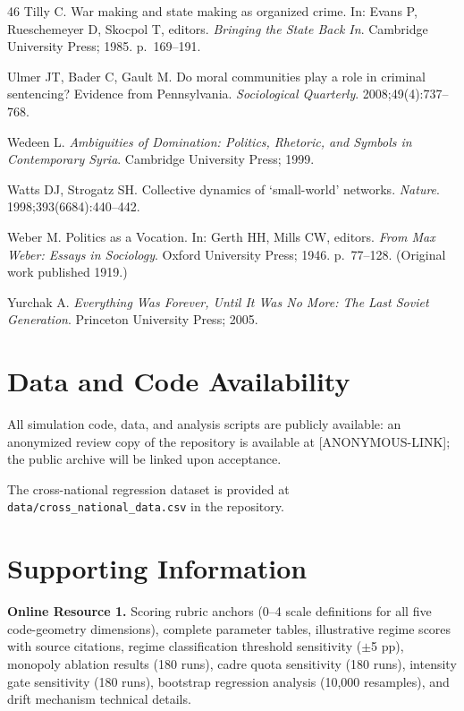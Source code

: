 \documentclass[12pt]{article}
\begin{document}
\begin{thebibliography}{46}
Tilly C.
War making and state making as organized crime.
In: Evans P, Rueschemeyer D, Skocpol T, editors.
\textit{Bringing the State Back In}.
Cambridge University Press; 1985. p.~169--191.

Ulmer JT, Bader C, Gault M.
Do moral communities play a role in criminal sentencing? Evidence from Pennsylvania.
\textit{Sociological Quarterly}. 2008;49(4):737--768.

Wedeen L.
\textit{Ambiguities of Domination: Politics, Rhetoric, and Symbols in Contemporary Syria}.
Cambridge University Press; 1999.

Watts DJ, Strogatz SH.
Collective dynamics of `small-world' networks.
\textit{Nature}. 1998;393(6684):440--442.

Weber M.
Politics as a Vocation.
In: Gerth HH, Mills CW, editors.
\textit{From Max Weber: Essays in Sociology}.
Oxford University Press; 1946. p.~77--128.
(Original work published 1919.)

Yurchak A.
\textit{Everything Was Forever, Until It Was No More: The Last Soviet Generation}.
Princeton University Press; 2005.

\end{thebibliography}

\section*{Data and Code Availability}

All simulation code, data, and analysis scripts are publicly available: an anonymized review copy of the repository is available at [ANONYMOUS-LINK]; the public archive will be linked upon acceptance.

The cross-national regression dataset is provided at \texttt{data/cross\_national\_data.csv}
in the repository.

\section*{Supporting Information}

\noindent\textbf{Online Resource 1.} Scoring rubric anchors (0--4 scale definitions for all five code-geometry dimensions), complete parameter tables, illustrative regime scores with source citations, regime classification threshold sensitivity ($\pm$5 pp), monopoly ablation results (180 runs), cadre quota sensitivity (180 runs), intensity gate sensitivity (180 runs), bootstrap regression analysis (10,000 resamples), and drift mechanism technical details.
\end{document}
